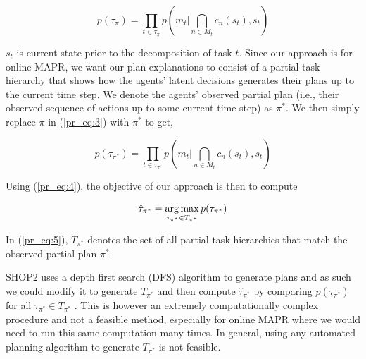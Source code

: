 \begin{equation} \label{pr_eq:3}
p(\tau_\pi) = \prod_{t \in \tau_\pi} p(m_t | \bigcap_{n \in M_t} c_n(s_t), s_t)
\end{equation}

$s_t$ is current state prior to the decomposition of task $t$. Since our approach is for online MAPR, we want our plan explanations to consist of a partial task hierarchy that shows how the agents' latent decisions generates their plans up to the current time step. We denote the agents' observed partial plan (i.e., their observed sequence of actions up to some current time step) as $\pi^*$. We then simply replace $\pi$ in (\ref{pr_eq:3}) with $\pi^*$ to get,

\begin{equation} \label{pr_eq:4}
p(\tau_{\pi^*}) = \prod_{t \in \tau_{\pi^*}} p(m_t | \bigcap_{n \in M_t} c_n(s_t), s_t)
\end{equation}

Using (\ref{pr_eq:4}), the objective of our approach is then to compute

\begin{equation} \label{pr_eq:5}
\hat{\tau}_{\pi^*} = \operatorname*{arg\,max}_{\tau_{\pi^*} \in T_{\pi^*}} p(\tau_{\pi^*})
\end{equation}

In (\ref{pr_eq:5}), $T_{\pi^*}$ denotes the set of all partial task hierarchies that match the observed partial plan $\pi^*$.

SHOP2 uses a depth first search (DFS) algorithm to generate plans and as such we could modify it to generate $T_{\pi^*}$ and then compute $\hat{\tau}_{\pi^*}$ by comparing $p(\tau_{\pi^*})$ for all $\tau_{\pi^*} \in T_{\pi^*}$ \citep{Nau_2003}. This is however an extremely computationally complex procedure and not a feasible method, especially for online MAPR where we would need to run this same computation many times. In general, using any automated planning algorithm to generate $T_{\pi^*}$ is not feasible.

